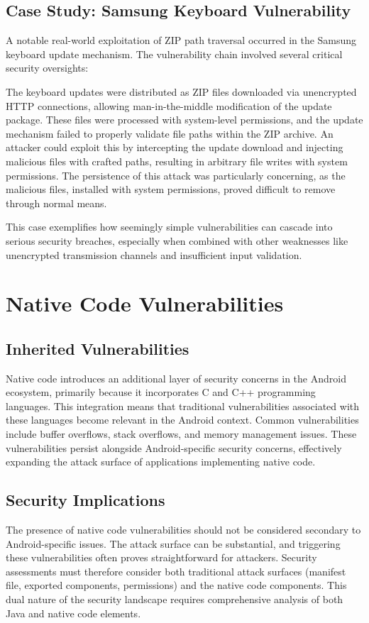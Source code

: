 \documentclass{article}
\begin{document}
\subsection{Case Study: Samsung Keyboard Vulnerability}
A notable real-world exploitation of ZIP path traversal occurred in the Samsung keyboard update mechanism. The vulnerability chain involved several critical security oversights:

The keyboard updates were distributed as ZIP files downloaded via unencrypted HTTP connections, allowing man-in-the-middle modification of the update package. These files were processed with system-level permissions, and the update mechanism failed to properly validate file paths within the ZIP archive. An attacker could exploit this by intercepting the update download and injecting malicious files with crafted paths, resulting in arbitrary file writes with system permissions. The persistence of this attack was particularly concerning, as the malicious files, installed with system permissions, proved difficult to remove through normal means.

This case exemplifies how seemingly simple vulnerabilities can cascade into serious security breaches, especially when combined with other weaknesses like unencrypted transmission channels and insufficient input validation.

\section{Native Code Vulnerabilities}
\subsection{Inherited Vulnerabilities}
Native code introduces an additional layer of security concerns in the Android ecosystem, primarily because it incorporates C and C++ programming languages. This integration means that traditional vulnerabilities associated with these languages become relevant in the Android context. Common vulnerabilities include buffer overflows, stack overflows, and memory management issues. These vulnerabilities persist alongside Android-specific security concerns, effectively expanding the attack surface of applications implementing native code.

\subsection{Security Implications}
The presence of native code vulnerabilities should not be considered secondary to Android-specific issues. The attack surface can be substantial, and triggering these vulnerabilities often proves straightforward for attackers. Security assessments must therefore consider both traditional attack surfaces (manifest file, exported components, permissions) and the native code components. This dual nature of the security landscape requires comprehensive analysis of both Java and native code elements.
\end{document}
